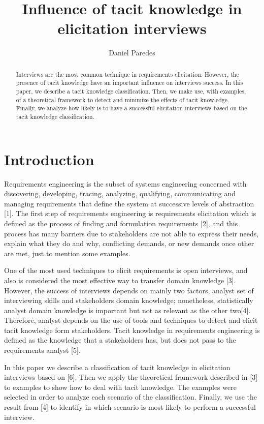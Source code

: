 \documentclass[]{llncs}
\institute{FH Dortmund, \\ \texttt{}}
\title{Influence of tacit knowledge in elicitation interviews}
\author{Daniel Paredes}
\date{}
\begin{document}
\maketitle
\begin{abstract}
Interviews are the most common technique in requirements elicitation.
However, the presence of tacit knowledge have an important influence on
interviews success. In this paper, we describe a tacit knowledge
classification. Then, we make use, with examples, of a theoretical
framework to detect and minimize the effects of tacit knowledge.
Finally, we analyze how likely is to have a successful elicitation
interviews based on the tacit knowledge classification.


\end{abstract}

\hypertarget{introduction}{%
\section{Introduction}\label{introduction}}

Requirements engineering is the subset of systems engineering concerned
with discovering, developing, tracing, analyzing, qualifying,
communicating and managing requirements that define the system at
successive levels of abstraction {[}1{]}. The first step of requirements
engineering is requirements elicitation which is defined as the process
of finding and formulation requirements {[}2{]}, and this process has
many barriers due to stakeholders are not able to express their needs,
explain what they do and why, conflicting demands, or new demands once
other are met, just to mention some examples.

One of the most used techniques to elicit requirements is open
interviews, and also is considered the most effective way to transfer
domain knowledge {[}3{]}. However, the success of interviews depends on
mainly two factors, analyst set of interviewing skills and stakeholders
domain knowledge; nonetheless, statistically analyst domain knowledge is
important but not as relevant as the other two{[}4{]}. Therefore,
analyst depends on the use of tools and techniques to detect and elicit
tacit knowledge form stakeholders. Tacit knowledge in requirements
engineering is defined as the knowledge that a stakeholders has, but
does not pass to the requirements analyst {[}5{]}.

In this paper we describe a classification of tacit knowledge in
elicitation interviews based on {[}6{]}. Then we apply the theoretical
framework described in {[}3{]} to examples to show how to deal with
tacit knowledge. The examples were selected in order to analyze each
scenario of the classification. Finally, we use the result from {[}4{]}
to identify in which scenario is most likely to perform a successful
interview.
\end{document}

